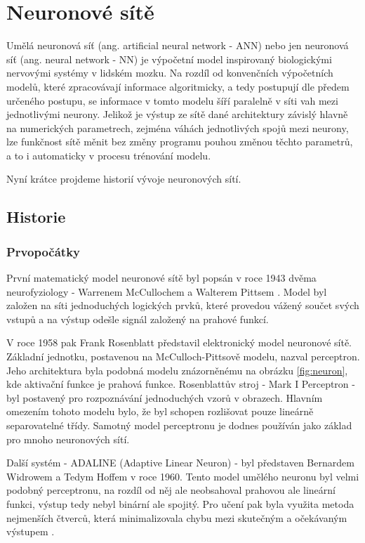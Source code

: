 \chapter{Neuronové sítě}
\label{chap:NN}

Umělá neuronová síť (ang. artificial neural network - ANN) nebo jen neuronová
síť (ang. neural network - NN) je výpočetní model inspirovaný biologickými
nervovými systémy v lidském mozku. Na rozdíl od konvenčních výpočetních modelů,
které zpracovávají informace algoritmicky, a tedy postupují dle předem určeného
postupu, se informace v tomto modelu šíří paralelně v síti vah mezi
jednotlivými neurony. Jelikož je výstup ze sítě dané architektury závislý
hlavně na numerických parametrech, zejména váhách jednotlivých spojů mezi
neurony, lze funkčnost sítě měnit bez změny programu pouhou změnou těchto
parametrů, a to i automaticky v procesu trénování modelu.

Nyní krátce projdeme historií vývoje neuronových sítí.

\section{Historie}
\label{sec:NN_History}

\subsection{Prvopočátky}
První matematický model neuronové sítě byl popsán v roce 1943 dvěma
neurofyziology - Warrenem McCullochem a Walterem Pittsem \cite{McCulloch1943}.
Model byl založen na síti jednoduchých logických prvků, které provedou vážený
součet svých vstupů a na výstup odešle signál založený na prahové funkcí.

V roce 1958 pak Frank Rosenblatt představil elektronický model neuronové sítě.
Základní jednotku, postavenou na McCulloch-Pittsově modelu, nazval perceptron.
\cite{Rosenblatt1958} Jeho architektura byla podobná modelu znázorněnému na
obrázku \ref{fig:neuron}, kde aktivační funkce je prahová funkce. Rosenblattův
stroj - Mark I Perceptron - byl postavený pro rozpoznávání jednoduchých vzorů v
obrazech. Hlavním omezením tohoto modelu bylo, že byl schopen rozlišovat pouze
lineárně separovatelné třídy. Samotný model perceptronu je dodnes používán jako
základ pro mnoho neuronových sítí.

Další systém - ADALINE (Adaptive Linear Neuron) - byl představen Bernardem
Widrowem a Tedym Hoffem v roce 1960. Tento model umělého neuronu byl velmi
podobný perceptronu, na rozdíl od něj ale neobsahoval prahovou ale lineární
funkci, výstup tedy nebyl binární ale spojitý. Pro učení pak byla využita
metoda nejmenších čtverců, která minimalizovala chybu mezi skutečným a
očekávaným výstupem \cite{nn_history}.

